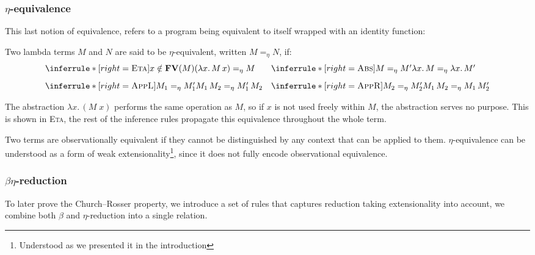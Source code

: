 \subsubsection{\centering $\eta$-equivalence}
This last notion of equivalence, refers to a program being equivalent to itself wrapped with an identity function:
\begin{definition} Two lambda terms \( M \) and \( N \) are said to be $\eta$-equivalent, written \( M =_\eta N \), if:
  \[
    \begin{array}{@{}l@{\quad}l@{}}
      \inferrule*[right=\textsc{Eta}]
      { x \notin \FV M }
      { (\lam{x}{M \, x}) =_\eta M   }
      &
        \inferrule*[right=\textsc{Abs}]
        { M =_\eta M' }
        { \lam{x}{M} =_\eta \lam{x}{M'} } \\[2ex]
      \inferrule*[right=\textsc{AppL}]
      { M_1 =_\eta M_1' }
      { M_1\,M_2 =_\eta M_1'\,M_2 }
      &
        \inferrule*[right=\textsc{AppR}]
        { M_2 =_\eta M_2' }
        { M_1\,M_2 =_\eta M_1\,M_2' }
    \end{array}
  \]

  The abstraction \( \lambda x.\, (M\;x) \) performs the same operation as \( M \), so if \( x \) is not used freely within \( M \), the abstraction serves no purpose. This is shown in \textsc{Eta}, the rest of the inference rules propagate this equivalence throughout the whole term.
\end{definition}
\begin{note}
  Two terms are observationally equivalent if they cannot be distinguished by any context that can be applied to them. $\eta$-equivalence can be understood as a form of weak extensionality\footnote{Understood as we presented it in the introduction}, since it does not fully encode observational equivalence.
\end{note}

\subsubsection{\centering $\beta\eta$-reduction}

To later prove the Church--Rosser property, we introduce a set of rules that captures reduction taking extensionality into account, we combine both $\beta$ and $\eta$-reduction into a single relation.

